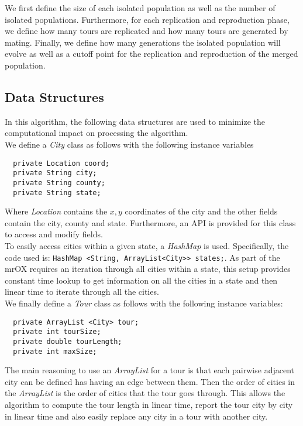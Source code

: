 \documentclass[12pt]{article}
\begin{document}
We first define the size of each isolated population as well as the number of isolated populations. Furthermore, for each replication and reproduction phase, we define how many tours are replicated and how many tours are generated by mating. Finally, we define how many generations the isolated population will evolve as well as a cutoff point for the replication and reproduction of the merged population.

\subsection{Data Structures}

In this algorithm, the following data structures are used to minimize the computational impact on processing the algorithm.\\

We define a \textit{City} class as follows with the following instance variables
\begin{verbatim}
  private Location coord;
  private String city;
  private String county;
  private String state;
\end{verbatim}

Where \textit{Location} contains the $x,y$ coordinates of the city and the other fields contain the city, county and state. Furthermore, an API is provided for this class to access and modify fields.\\

To easily access cities within a given state, a \textit{HashMap} is used. Specifically, the code used is: \verb|HashMap <String, ArrayList<City>> states;|. As part of the mrOX requires an iteration through all cities within a state, this setup provides constant time lookup to get information on all the cities in a state and then linear time to iterate through all the cities.\\


We finally define a \textit{Tour} class as follows with the following instance variables:
\begin{verbatim}
  private ArrayList <City> tour;
  private int tourSize;
  private double tourLength;
  private int maxSize;
\end{verbatim}

The main reasoning to use an \textit{ArrayList} for a tour is that each pairwise adjacent city can be defined has having an edge between them. Then the order of cities in the \textit{ArrayList} is the order of cities that the tour goes through. This allows the algorithm to compute the tour length in linear time, report the tour city by city in linear time and also easily replace any city in a tour with another city.
\end{document}
